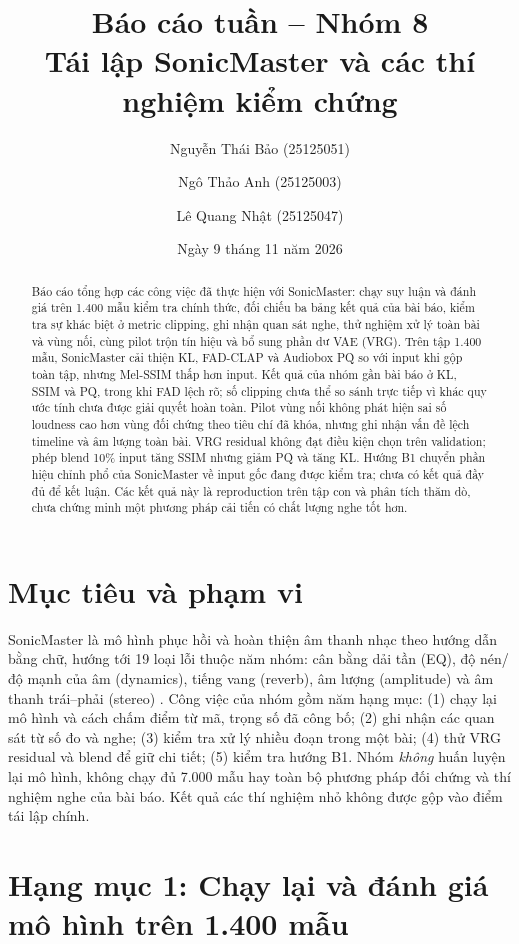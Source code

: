 \documentclass[10pt,a4paper]{article}
\title{Báo cáo tuần -- Nhóm 8\\[0.4em]\large Tái lập SonicMaster và các thí nghiệm kiểm chứng}
\author{Nguyễn Thái Bảo (25125051) \and Ngô Thảo Anh (25125003) \and Lê Quang Nhật (25125047)}
\date{Ngày 9 tháng 11 năm 2026}
\begin{document}
\maketitle
\begin{abstract}
Báo cáo tổng hợp các công việc đã thực hiện với SonicMaster: chạy suy luận và đánh giá trên 1.400 mẫu kiểm tra chính thức, đối chiếu ba bảng kết quả của bài báo, kiểm tra sự khác biệt ở metric clipping, ghi nhận quan sát nghe, thử nghiệm xử lý toàn bài và vùng nối, cùng pilot trộn tín hiệu và bổ sung phần dư VAE (VRG). Trên tập 1.400 mẫu, SonicMaster cải thiện KL, FAD-CLAP và Audiobox PQ so với input khi gộp toàn tập, nhưng Mel-SSIM thấp hơn input. Kết quả của nhóm gần bài báo ở KL, SSIM và PQ, trong khi FAD lệch rõ; số clipping chưa thể so sánh trực tiếp vì khác quy ước tính chưa được giải quyết hoàn toàn. Pilot vùng nối không phát hiện sai số loudness cao hơn vùng đối chứng theo tiêu chí đã khóa, nhưng ghi nhận vấn đề lệch timeline và âm lượng toàn bài. VRG residual không đạt điều kiện chọn trên validation; phép blend 10\% input tăng SSIM nhưng giảm PQ và tăng KL. Hướng B1 chuyển phần hiệu chỉnh phổ của SonicMaster về input gốc đang được kiểm tra; chưa có kết quả đầy đủ để kết luận. Các kết quả này là reproduction trên tập con và phân tích thăm dò, chưa chứng minh một phương pháp cải tiến có chất lượng nghe tốt hơn.
\end{abstract}

\section{Mục tiêu và phạm vi}
SonicMaster là mô hình phục hồi và hoàn thiện âm thanh nhạc theo hướng dẫn bằng chữ, hướng tới 19 loại lỗi thuộc năm nhóm: cân bằng dải tần (EQ), độ nén/độ mạnh của âm (dynamics), tiếng vang (reverb), âm lượng (amplitude) và âm thanh trái--phải (stereo) \cite{sonicmaster}. Công việc của nhóm gồm năm hạng mục: (1) chạy lại mô hình và cách chấm điểm từ mã, trọng số đã công bố; (2) ghi nhận các quan sát từ số đo và nghe; (3) kiểm tra xử lý nhiều đoạn trong một bài; (4) thử VRG residual và blend để giữ chi tiết; (5) kiểm tra hướng B1. Nhóm \emph{không} huấn luyện lại mô hình, không chạy đủ 7.000 mẫu hay toàn bộ phương pháp đối chứng và thí nghiệm nghe của bài báo. Kết quả các thí nghiệm nhỏ không được gộp vào điểm tái lập chính.

\section{Hạng mục 1: Chạy lại và đánh giá mô hình trên 1.400 mẫu}
\end{document}
